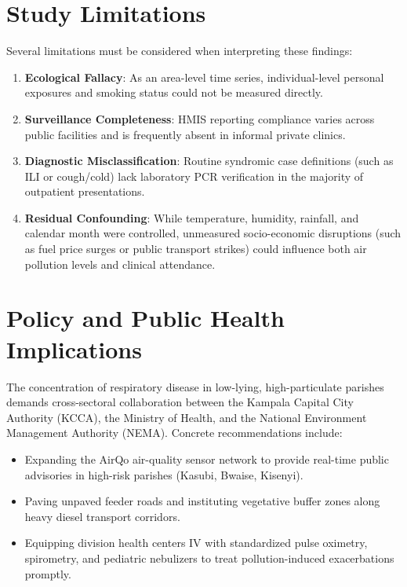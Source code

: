 \documentclass[12pt,a4paper]{report}
\begin{document}
\section{Study Limitations}
Several limitations must be considered when interpreting these findings:
\begin{enumerate}
    \item \textbf{Ecological Fallacy}: As an area-level time series, individual-level personal exposures and smoking status could not be measured directly.
    \item \textbf{Surveillance Completeness}: HMIS reporting compliance varies across public facilities and is frequently absent in informal private clinics.
    \item \textbf{Diagnostic Misclassification}: Routine syndromic case definitions (such as ILI or cough/cold) lack laboratory PCR verification in the majority of outpatient presentations.
    \item \textbf{Residual Confounding}: While temperature, humidity, rainfall, and calendar month were controlled, unmeasured socio-economic disruptions (such as fuel price surges or public transport strikes) could influence both air pollution levels and clinical attendance.
\end{enumerate}

\section{Policy and Public Health Implications}
The concentration of respiratory disease in low-lying, high-particulate parishes demands cross-sectoral collaboration between the Kampala Capital City Authority (KCCA), the Ministry of Health, and the National Environment Management Authority (NEMA). Concrete recommendations include:
\begin{itemize}
    \item Expanding the AirQo air-quality sensor network to provide real-time public advisories in high-risk parishes (Kasubi, Bwaise, Kisenyi).
    \item Paving unpaved feeder roads and instituting vegetative buffer zones along heavy diesel transport corridors.
    \item Equipping division health centers IV with standardized pulse oximetry, spirometry, and pediatric nebulizers to treat pollution-induced exacerbations promptly.
\end{itemize}
\end{document}
